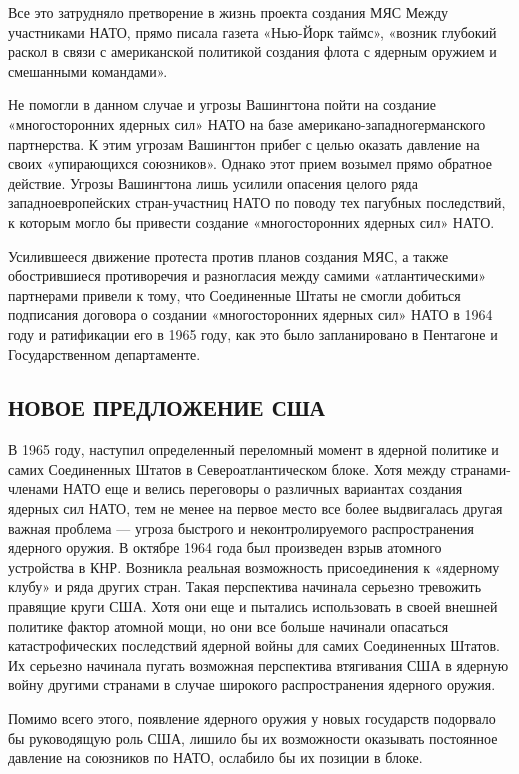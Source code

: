 \documentclass[12pt, a4paper, openany]{book}
\begin{document}
		Все это затрудняло претворение в жизнь проекта создания МЯС Между участниками НАТО, прямо писала газета «Нью-Йорк таймс», «возник глубокий раскол в связи с американской политикой создания флота с ядерным оружием и смешанными командами».
		
		Не помогли в данном случае и угрозы Вашингтона пойти на создание «многосторонних ядерных сил» НАТО на базе американо-западногерманского партнерства. К этим угрозам Вашингтон прибег с целью оказать давление на своих «упирающихся союзников». Однако этот прием возымел прямо обратное действие. Угрозы Вашингтона лишь усилили опасения целого ряда западноевропейских стран-участниц НАТО по поводу тех пагубных последствий, к которым могло бы привести создание «многосторонних ядерных сил» НАТО.
		
		Усилившееся движение протеста против планов создания МЯС, а также обострившиеся противоречия и разногласия между самими «атлантическими» партнерами привели к тому, что Соединенные Штаты не смогли добиться подписания договора о создании «многосторонних ядерных сил» НАТО в 1964 году и ратификации его в 1965 году, как это было запланировано в Пентагоне и Государственном департаменте.
		
		\subsection[Новое предложение США]{\center НОВОЕ ПРЕДЛОЖЕНИЕ США}	
		
		
		В 1965 году, наступил определенный переломный момент в ядерной политике и самих Соединенных Штатов в Североатлантическом блоке. Хотя между странами-членами НАТО еще и велись переговоры о различных вариантах создания ядерных сил НАТО, тем не менее на первое место все более выдвигалась другая важная проблема — угроза быстрого и неконтролируемого распространения ядерного оружия. В октябре 1964 года был произведен взрыв атомного устройства в КНР. Возникла реальная возможность присоединения к «ядерному клубу» и ряда других стран. Такая перспектива начинала серьезно тревожить правящие круги США. Хотя они еще и пытались использовать в своей внешней политике фактор атомной мощи, но они все больше начинали опасаться катастрофических последствий ядерной войны для самих Соединенных Штатов. Их серьезно начинала пугать возможная перспектива втягивания США в ядерную войну другими странами в случае широкого распространения ядерного оружия.
		
		Помимо всего этого, появление ядерного оружия у новых государств подорвало бы руководящую роль США, лишило бы их возможности оказывать постоянное давление на союзников по НАТО, ослабило бы их позиции в блоке.
		
\end{document}
